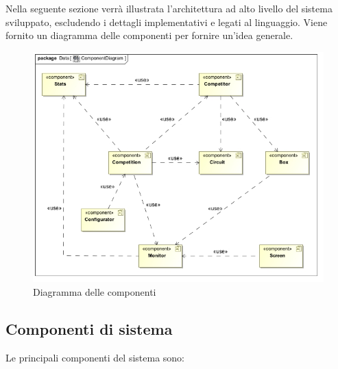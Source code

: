 \label{architettura_alto_livello}
Nella seguente sezione verr\`{a} illustrata l'architettura ad alto livello del sistema sviluppato, 
escludendo i dettagli implementativi e legati al linguaggio. Viene fornito un diagramma delle componenti per fornire un'idea
generale.\\
\begin{center}
\begin{figure}[h!]
	\includegraphics[scale=0.50]{img/ComponentDiagram.jpg}
	\caption{Diagramma delle componenti}
\end{figure}
\end{center}
\subsection{Componenti di sistema}
Le principali componenti del sistema sono:
